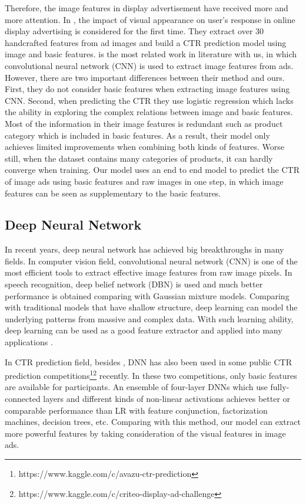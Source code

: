 \documentclass{sig-alternate}
\begin{document}
Therefore, the image features in display advertisement have received more and more attention. In \cite{azimi2012impact,cheng2012multimedia}, the impact of  visual appearance  on user's response in online display advertising is considered for the first time. They extract over 30 handcrafted features from ad images and build a CTR prediction model using image and basic  features.   \cite{Mo:2015:IFL:2832747.2832769} is the most related work  in literature with us, in which convolutional neural network (CNN) is used to extract image features from ads. However, there are two important differences between their method and ours.   First, they do not consider basic features when extracting image features using CNN. Second,  when predicting the CTR they  use logistic regression which lacks the ability in exploring the complex relations between image and basic features. Most of the information in their image features is redundant  such as product category which is included in basic features. As a result, their model only achieves limited improvements when combining both kinds of features. Worse still, when the dataset contains many categories of products, it can hardly converge when training. Our model uses an end to end model to predict the CTR of image ads using basic features and raw images in one step, in which image features can be seen as  supplementary to the basic features.
\subsection{Deep Neural Network} 
In recent years, deep neural network has achieved big breakthroughs in many fields. In computer vision field, convolutional neural network (CNN) \cite{NIPS2012_4824} is one of the most efficient tools to extract effective image features from raw image pixels.  In speech recognition, deep belief network (DBN) \cite{hinton2012deep} is used and much better performance is obtained comparing with Gaussian mixture models. Comparing with traditional models that have shallow structure, deep learning can model the underlying patterns  from massive and complex data. With such learning ability, deep learning can be used as a good feature extractor and applied into many applications \cite{ren2015faster,simonyan2014two}.

In CTR prediction field, besides \cite{zhang2016deep}, DNN has also been used in some public CTR prediction  competitions\footnote{https://www.kaggle.com/c/avazu-ctr-prediction}\footnote{https://www.kaggle.com/c/criteo-display-ad-challenge} recently. In these two competitions, only basic features are available for participants. An ensemble of four-layer DNNs which use fully-connected layers and different kinds of non-linear activations  achieves better or comparable performance than LR with feature conjunction, factorization machines, decision trees, etc. Comparing with this method, our model can extract more powerful features by taking consideration  of the visual features in image ads. 
\end{document}
